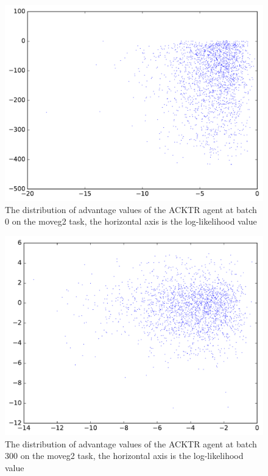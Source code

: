 \begin{figure}[!htbp]
	\includegraphics[width=\textwidth]{images/vis_stats_0.pdf}
	\centering
	\caption{The distribution of advantage values of the ACKTR agent at batch 0 on the moveg2 task, the horizontal axis is the log-likelihood value}
	\label{vis_stats_0}
\end{figure}

\begin{figure}[!htbp]
	\includegraphics[width=\textwidth]{images/vis_stats_3000.pdf}
	\centering
	\caption{The distribution of advantage values of the ACKTR agent at batch 300 on the moveg2 task, the horizontal axis is the log-likelihood value}
	\label{vis_stats_3000}
\end{figure}

